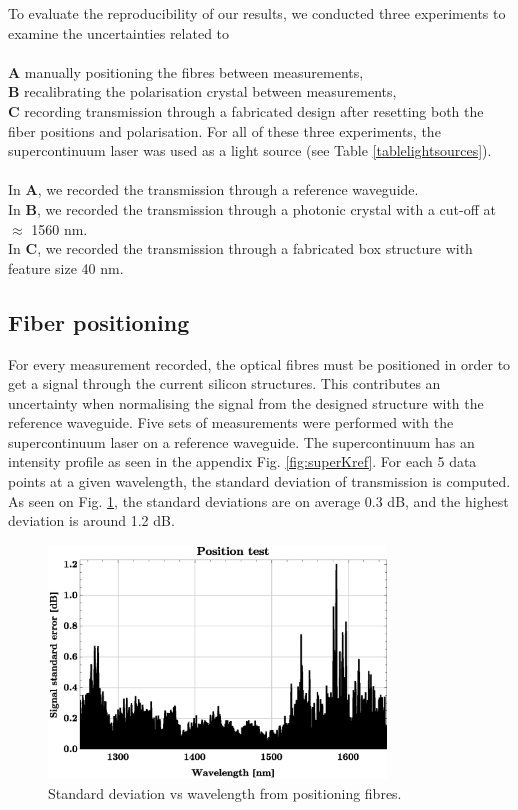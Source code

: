 
To evaluate the reproducibility of our results, we conducted three experiments to examine the uncertainties related to\\
\\
\textbf{A} manually positioning the fibres between measurements, \\
\textbf{B} recalibrating the polarisation crystal between measurements, \\
\textbf{C} recording transmission through a fabricated design after resetting both the fiber positions and polarisation. For all of these three experiments, the supercontinuum laser was used as a light source (see Table \ref{tablelightsources}).\\
\\
In \textbf{A}, we recorded the transmission through a reference waveguide. \\
In \textbf{B}, we recorded the transmission through a photonic crystal with a cut-off at $\approx$ 1560 nm.\\
In \textbf{C}, we recorded the transmission through a fabricated box structure with feature size 40 nm.

\subsection{Fiber positioning}

For every measurement recorded, the optical fibres must be positioned in order to get a signal through the current silicon structures. This contributes an uncertainty when normalising the signal from the designed structure with the reference waveguide. Five sets of measurements were performed with the supercontinuum laser on a reference waveguide. The supercontinuum has an intensity profile as seen in the appendix Fig. \ref{fig:superKref}. 
For each 5 data points at a given wavelength, the standard deviation of transmission is computed. As seen on Fig. \ref{fig:PositionError}, the standard deviations are on average 0.3 dB, and the highest deviation is around 1.2 dB. 

\begin{figure}[h!]
    \centering
    \includegraphics[width=0.8\textwidth]{fig/statistics/positiontest.eps}
    \caption{Standard deviation vs wavelength from positioning fibres.}
    \label{fig:PositionError}
\end{figure}

